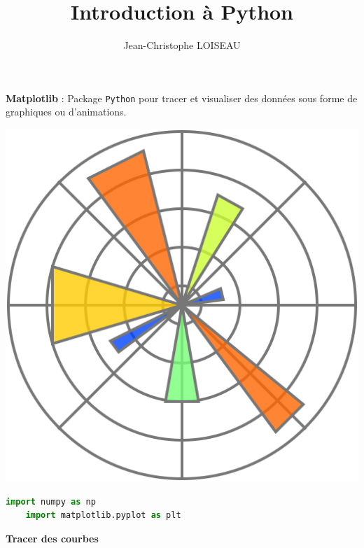 \documentclass[aspectratio=169]{beamer}
\title{Introduction à Python}
\author{Jean-Christophe LOISEAU}
\institute{Arts \& Métiers Institute of Technology, 2021-2022}
\date{}
\begin{document}
\frame{\titlepage}





\begin{frame}[fragile]{}{}
  \begin{minipage}{.64\textwidth}
    \textbf{\alert{Matplotlib}} : Package \verb+Python+ pour tracer et visualiser des données sous forme de graphiques ou d'animations.
  \end{minipage}%
  \hfill
  \begin{minipage}{.32\textwidth}
    \centering
    \includegraphics[width=.75\textwidth]{matplotlib_logo}
  \end{minipage}

  \vspace{-1cm}
\end{frame}





\frame{}




\begin{frame}[fragile]{}{}
  \vfill
  \begin{lstlisting}[language=Python]
    import numpy as np
    import matplotlib.pyplot as plt
  \end{lstlisting}
  \vfill
\end{frame}





\begin{frame}
  \vfill
  \centering
  \textbf{Tracer des courbes}
  \vfill
\end{frame}
\end{document}
